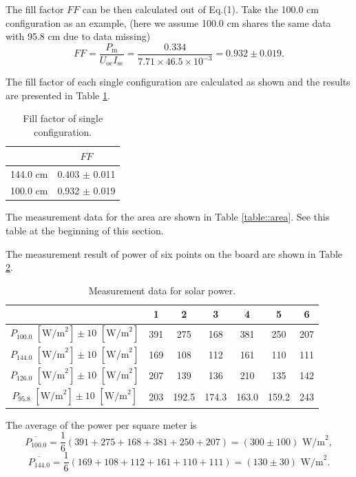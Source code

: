 \documentclass[a4paper]{article}
\begin{document}
The fill factor $FF$ can be then calculated out of Eq.(1). Take the 100.0 cm configuration as an example, (here we assume 100.0 cm shares the same data with 95.8 cm due to data missing)
$$FF = \frac{P_\text{m}}{U_\text{oc}I_\text{sc}} = \frac{0.334}{7.71\times 46.5\times 10^{-3}} = 0.932 \pm 0.019.$$

The fill factor of each single configuration are calculated as shown and the results are presented in Table \ref{table::fill factor}.

\begin{table}[H]
	\centering
	\begin{tabular}{cc}
		\hline
		          & $FF$               \\
		\hline
		144.0 cm  & 0.403  $\pm$ 0.011 \\
		100.0  cm & 0.932  $\pm$ 0.019 \\
		\hline
	\end{tabular}
	\caption{Fill factor of single configuration.}
	\label{table::fill factor}
\end{table}

The measurement data for the area are shown in Table \ref{table::area}. See this table at the beginning of this section.

The measurement result of power of six points on the board are shown in Table \ref{table::P_in}.
\begin{table}[H]
	\centering
	\begin{tabular}{ccccccc}
		\hline
		                                                       & 1   & 2     & 3     & 4     & 5     & 6   \\
		\hline
		$P_{100.0}\,\,[\text{W/m}^2] \pm 10\,\,[\text{W/m}^2]$ & 391 & 275   & 168   & 381   & 250   & 207 \\
		$P_{144.0}\,\,[\text{W/m}^2] \pm 10\,\,[\text{W/m}^2]$ & 169 & 108   & 112   & 161   & 110   & 111 \\
		$P_{126.0}\,\,[\text{W/m}^2] \pm 10\,\,[\text{W/m}^2]$ & 207 & 139   & 136   & 210   & 135   & 142 \\
		$P_{95.8} \,\,[\text{W/m}^2] \pm 10\,\,[\text{W/m}^2]$ & 203 & 192.5 & 174.3 & 163.0 & 159.2 & 243 \\
		\hline
	\end{tabular}
	\caption{Measurement data for solar power.}
	\label{table::P_in}
\end{table}

The average of the power per square meter is
$$\overline{P_{100.0}} = \frac{1}{6}(391+275+168+381+250+207) = (300 \pm 100)\,\,\text{W/m}^2,$$
$$\overline{P_{144.0}} = \frac{1}{6}(169+108+112+161+110+111) = (130 \pm 30)\,\,\text{W/m}^2.$$
\end{document}
